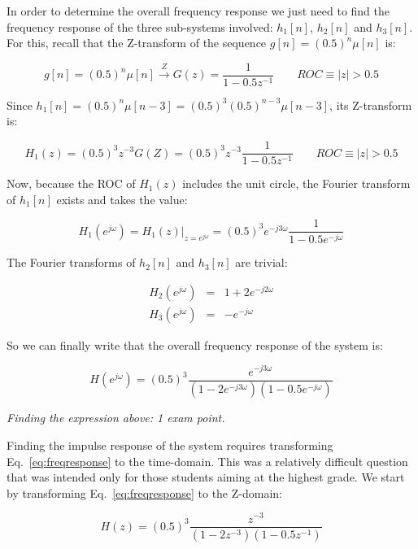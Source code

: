\documentclass[a4paper,11pt,oneside]{article}
\begin{document}
In order to determine the overall frequency response we just need to find the frequency response of the three sub-systems involved: $h_1[n]$, $h_2[n]$ and $h_3[n]$. For this, recall that the Z-transform of the sequence $g[n]=(0.5)^n \mu[n]$ is:

\begin{equation}
g[n]=(0.5)^n \mu[n] \stackrel{Z}{\longrightarrow} G(z)=\frac{1}{1-0.5 z^{-1}} \qquad ROC\equiv |z|>0.5
\end{equation}

Since $h_1[n]=(0.5)^{n}\mu[n-3]=(0.5)^3(0.5)^{n-3}\mu[n-3]$, its Z-transform is:

\begin{equation}
H_1(z)=(0.5)^3z^{-3}G(Z)=(0.5)^3z^{-3}\frac{1}{1-0.5 z^{-1}} \qquad ROC\equiv |z|>0.5
\end{equation}

Now, because the ROC of $H_1(z)$ includes the unit circle, the Fourier transform of $h_1[n]$ exists and takes the value:

\begin{equation}
H_1(e^{j\omega})=H_1(z)|_{z=e^{j\omega}}=(0.5)^3e^{-j3\omega}\frac{1}{1-0.5 e^{-j\omega}}
\end{equation}


The Fourier transforms of $h_2[n]$ and $h_3[n]$ are trivial:

\begin{eqnarray}
H_2(e^{j\omega})&=&1+2e^{-j2\omega}\\
H_3(e^{j\omega})&=&-e^{-j\omega}
\end{eqnarray}

So we can finally write that the overall frequency response of the system is:

\begin{equation}\label{eq:freqresponse}
H(e^{j\omega})=(0.5)^3\frac{e^{-j3\omega}}{(1-2e^{-j3\omega})(1-0.5e^{-j\omega})}
\end{equation}

\emph{Finding the expression above: 1 exam point.}

Finding the impulse response of the system requires transforming Eq.~\ref{eq:freqresponse} to the time-domain. This was a relatively difficult question that was intended only for those students aiming at the highest grade. We start by transforming Eq.~\ref{eq:freqresponse} to the Z-domain:

\begin{equation}\label{eq:systemfunction}
H(z)=(0.5)^3\frac{z^{-3}}{(1-2z^{-3})(1-0.5z^{-1})}
\end{equation}
\end{document}
